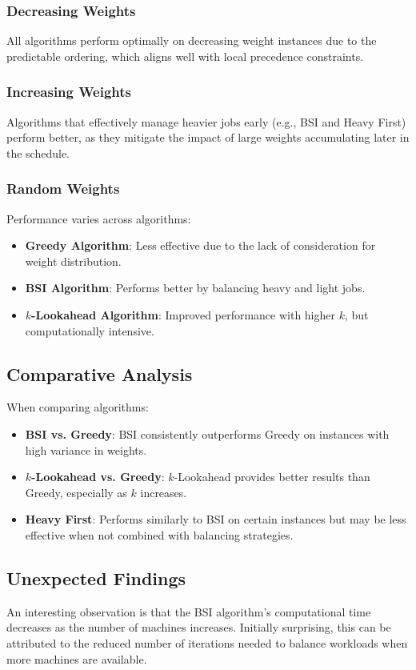 \subsubsection*{Decreasing Weights}

All algorithms perform optimally on decreasing weight instances due to the predictable ordering, which aligns well with local precedence constraints.

\subsubsection*{Increasing Weights}

Algorithms that effectively manage heavier jobs early (e.g., BSI and Heavy First) perform better, as they mitigate the impact of large weights accumulating later in the schedule.

\subsubsection*{Random Weights}

Performance varies across algorithms:

\begin{itemize}
    \item \textbf{Greedy Algorithm}: Less effective due to the lack of consideration for weight distribution.
    \item \textbf{BSI Algorithm}: Performs better by balancing heavy and light jobs.
    \item \textbf{$k$-Lookahead Algorithm}: Improved performance with higher $k$, but computationally intensive.
\end{itemize}

\subsection*{Comparative Analysis}

When comparing algorithms:

\begin{itemize}
    \item \textbf{BSI vs. Greedy}: BSI consistently outperforms Greedy on instances with high variance in weights.
    \item \textbf{$k$-Lookahead vs. Greedy}: $k$-Lookahead provides better results than Greedy, especially as $k$ increases.
    \item \textbf{Heavy First}: Performs similarly to BSI on certain instances but may be less effective when not combined with balancing strategies.
\end{itemize}

\subsection*{Unexpected Findings}

An interesting observation is that the BSI algorithm's computational time decreases as the number of machines increases. Initially surprising, this can be attributed to the reduced number of iterations needed to balance workloads when more machines are available.
